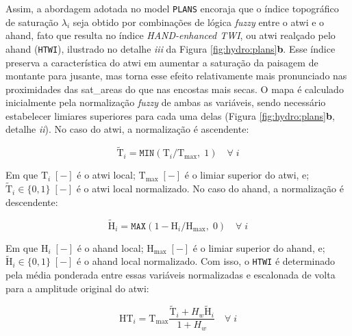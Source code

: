 \documentclass[./main.tex]{subfiles}
\begin{document}
\par Assim, a abordagem adotada no \gls{model} \texttt{PLANS} encoraja que o índice topográfico de saturação $\lambda_i$ seja obtido por combinações de lógica \textit{fuzzy} entre o \acrshort{atwi} e o \acrshort{ahand}, fato que resulta no índice \textit{HAND-enhanced TWI}, ou \acrshort{atwi} realçado pelo \acrshort{ahand} (\texttt{HTWI}), ilustrado no detalhe \textit{iii} da Figura \ref{fig:hydro:plans}\textbf{b}. Esse índice preserva a característica do \acrshort{atwi} em aumentar a saturação da paisagem de montante para jusante, mas torna esse efeito relativamente mais pronunciado nas proximidades das \gls{sat_areas} do que nas encostas mais secas. O mapa é calculado inicialmente pela normalização \textit{fuzzy} de ambas as variáveis, sendo necessário estabelecer limiares superiores para cada uma delas (Figura \ref{fig:hydro:plans}\textbf{b}, detalhe \textit{ii}). No caso do \acrshort{atwi}, a normalização é ascendente: 
\begin{linenomath*}
\begin{equation}
\label{eq:plans:ftwi}
\tilde{\text{T}}_i = \texttt{MIN}(\text{T}_i/\text{T}_\text{max},\; 1) \quad \forall \; i
\end{equation}
\end{linenomath*}
Em que  $\text{T}_i\;[-]$ é o \acrshort{atwi} local; $\text{T}_\text{max}\;[-]$ é o limiar superior do \acrshort{atwi}, e; $\tilde{\text{T}}_i\in \{0,1\}\;[-]$ é o \acrshort{atwi} local normalizado. No caso do \acrshort{ahand}, a normalização é descendente:
\begin{linenomath*}
\begin{equation}
\label{eq:plans:ftwi}
\tilde{\text{H}}_i = \texttt{MAX}(1 - \text{H}_i/\text{H}_\text{max},\; 0) \quad \forall \; i
\end{equation}
\end{linenomath*}
Em que  $\text{H}_i\;[-]$ é o \acrshort{ahand} local; $\text{H}_\text{max}\;[-]$ é o limiar superior do \acrshort{ahand}, e; $\tilde{\text{H}}_i\in \{0,1\}\;[-]$ é o \acrshort{ahand} local normalizado. Com isso, o \texttt{HTWI} é determinado pela média ponderada entre essas variáveis normalizadas e escalonada de volta para a amplitude original do \acrshort{atwi}:
\begin{linenomath*}
\begin{equation}
\label{eq:plans:htwi}
\text{HT}_{i} = \text{T}_\text{max} \frac{\tilde{\text{T}}_i + H_w \tilde{\text{H}}_i}{1 + H_w} \quad \forall \; i
\end{equation}
\end{linenomath*}
\end{document}

